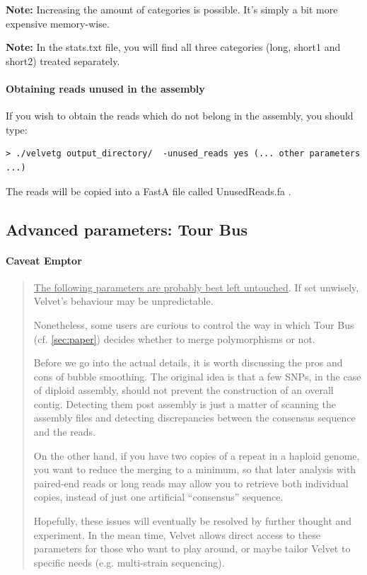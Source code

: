 \documentclass{article}
\begin{document}
\textbf{Note:} Increasing the amount of categories is possible. It's simply a bit more
expensive memory-wise. 

\textbf{Note:} In the stats.txt file, you will find all three categories (long,
short1 and short2) treated separately.

	\paragraph{Obtaining reads unused in the assembly}
	
	If you wish to obtain the reads which do not belong in the assembly, you should type:
	
\begin{verbatim}
> ./velvetg output_directory/  -unused_reads yes (... other parameters ...)
\end{verbatim}	

	The reads will be copied into a FastA file called UnusedReads.fa .

\subsection{Advanced parameters: Tour Bus}

\paragraph{Caveat Emptor}
\begin{quotation}
\underline{The following parameters are probably best left untouched}. If set unwisely, Velvet's behaviour may be unpredictable. 

Nonetheless, some users are curious to control the way in which Tour Bus (cf. \ref{sec:paper}) decides whether to merge polymorphisms or not.

Before we go into the actual details, it is worth discussing the pros and cons of bubble smoothing. The original idea is that a few SNPs, in the case of diploid assembly, should not prevent the construction of an overall contig. Detecting them post assembly is just a matter of scanning the assembly files and detecting discrepancies between the consensus sequence and the reads.  

On the other hand, if you have two copies of a repeat in a haploid genome, you want to reduce the merging to a minimum, so that later analysis with paired-end reads or long reads may allow you to retrieve both individual copies, instead of just one artificial ``consensus'' sequence.

Hopefully, these issues will eventually be resolved by further thought and experiment. In the mean time, Velvet allows direct access to these parameters for those who want to play around, or maybe tailor Velvet to specific needs (e.g. multi-strain sequencing). 
\end{quotation}
\end{document}
